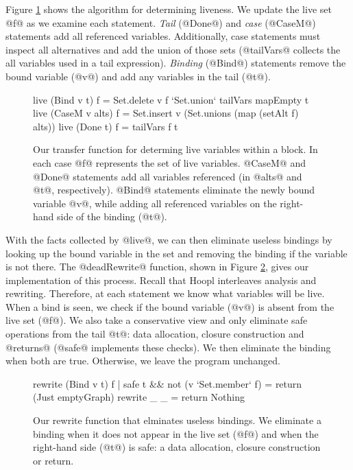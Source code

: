 \documentclass[12pt]{report}
\begin{document}

Figure \ref{ref_fig_liveTransfer} shows the algorithm for determining
liveness. We update the live set @f@ as we examine each
statement. \emph{Tail} (@Done@) and \emph{case} (@CaseM@) statements
add all referenced variables. Additionally, case statements must
inspect all alternatives and add the union of those sets (@tailVars@
collects the all variables used in a tail expression). \emph{Binding}
(@Bind@) statements remove the bound variable (@v@) and add any
variables in the tail (@t@).

\begin{figure}[h]
\begin{code}
live (Bind v t) f = Set.delete v f  `Set.union` tailVars mapEmpty t
live (CaseM v alts) f = Set.insert v (Set.unions (map (setAlt f) alts))
live (Done t) f = tailVars f t
\end{code}
\caption{Our transfer function for determing live variables within a block. In
each case @f@ represents the set of live variables. @CaseM@ and @Done@ statements
add all variables referenced (in @alts@ and @t@, respectively). @Bind@ statements
eliminate the newly bound variable @v@, while adding all referenced variables on the
right-hand side of the binding (@t@).}
\label{ref_fig_liveTransfer}
\end{figure}

With the facts collected by @live@, we can then eliminate useless
bindings by looking up the bound variable in the set and removing the
binding if the variable is not there. The @deadRewrite@ function,
shown in Figure \ref{ref_fig_deadRewrite}, gives our implementation of
this process. Recall that Hoopl interleaves analysis and rewriting.
Therefore, at each statement we know what variables will be live. When
a bind is seen, we check if the bound variable (@v@) is absent from
the live set (@f@). We also take a conservative view and only
eliminate safe operations from the tail @t@: data allocation, closure
construction and @returns@ (@safe@ implements these checks). We then
eliminate the binding when both are true. Otherwise, we leave the
program unchanged.

\begin{figure}[h]
\begin{code}
rewrite (Bind v t) f
  | safe t && not (v `Set.member` f) = return (Just emptyGraph)
rewrite _ _ = return Nothing
\end{code}
\caption{Our rewrite function that elminates useless bindings. We eliminate a
binding when it does not appear in the live set (@f@) and when the right-hand side
(@t@) is safe: a data allocation, closure construction or return.}
\label{ref_fig_deadRewrite}
\end{figure}
\end{document}
